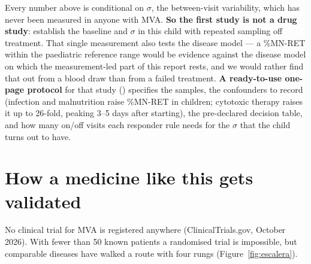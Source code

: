 \documentclass[10pt]{article}
\begin{document}
\noindent Every number above is conditional on $\sigma$, the between-visit variability, which has never been
measured in anyone with MVA. \textbf{So the first study is not a drug study}: establish the baseline and $\sigma$
in this child with repeated sampling off treatment. That single measurement also tests the disease model --- a
\%MN-RET within the paediatric reference range would be evidence against the disease model on which the
measurement-led part of this report rests, and
we would rather find that out from a blood draw than from a failed treatment. \textbf{A ready-to-use one-page
protocol} for that study () specifies the samples, the confounders to record
(infection and malnutrition raise \%MN-RET in children; cytotoxic therapy raises it up to 26-fold, peaking 3--5 days after starting),
the pre-declared decision table, and how many on/off visits each responder rule needs for the $\sigma$ that the
child turns out to have.

\section{How a medicine like this gets validated}
\label{sec:validacion}
No clinical trial for MVA is registered anywhere (ClinicalTrials.gov, October 2026). With fewer than 50 known
patients a randomised trial is impossible, but comparable diseases have walked a route with four rungs
(Figure~\ref{fig:escalera}).
\end{document}
